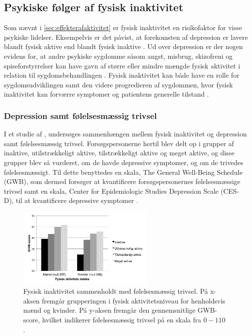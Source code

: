 \subsection{Psykiske følger af fysisk inaktivitet}
Som nævnt i \autoref{sec:effekterafaktivitet} er fysisk inaktivitet en risikofaktor for visse psykiske lidelser. Eksempelvis er det påvist, at forekomsten af depression er lavere blandt fysisk aktive end blandt fysisk inaktive \citep{motionsraad2007}. Ud over depression er der nogen evidens for, at andre psykiske sygdomme såsom angst, misbrug, skizofreni og spiseforstyrrelser kan have gavn af større eller mindre mængde fysisk aktivitet i relation til sygdomsbehandlingen \citep{kessing2016}. Fysisk inaktivitet kan både have en rolle for sygdomsudviklingen samt den videre progredieren af sygdommen, hvor fysisk inaktivitet kan forværre symptomer og patientens generelle tilstand \citep{motionsraad2007,kessing2016}.

\subsubsection{Depression samt følelsesmæssig trivsel}
I et studie af \citeauthor{galper2006}, undersøges sammenhængen mellem fysisk inaktivitet og depression samt følelsesmæssig trivsel. Forsøgspersonerne hertil blev delt op i grupper af inaktive, utilstrækkeligt aktive, tilstrækkeligt aktive og meget aktive, og disse grupper blev så vurderet, om de havde depressive symptomer, og om de trivedes følelsesmæssigt. 
Til dette benyttedes en skala, The General Well-Being Schedule (GWB), som dermed forsøger at kvantificere forsøgspersonernes følelsesmæssige trivsel samt en skala, Center for Epidemiologic Studies Depression Scale (CES-D), til at kvantificere depressive symptomer \citep{galper2006}.

\begin{figure}[H]
\centering
\includegraphics[width=0.6\textwidth]{figures/inaktivitet_gwb}
\caption{Fysisk inaktivitet sammenholdt med følelsesmæssig trivsel. På x-aksen fremgår grupperingen i fysisk aktivitetsniveau for henholdsvis mænd og kvinder. På y-aksen fremgår den gennemsnitlige GWB-score, hvilket indikerer følelsesmæssig trivsel på en skala fra $0-110$ \citep{galper2006}.}
\label{fig:inaktivitet_gwb}
\end{figure}

